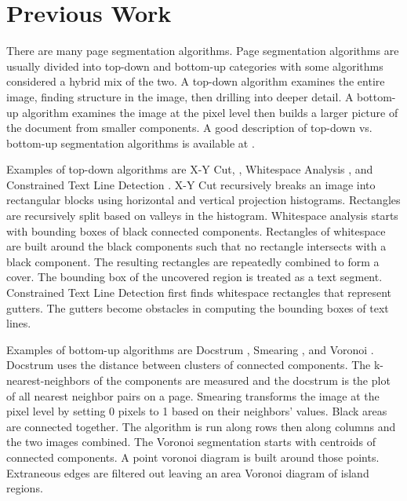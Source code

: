 \documentclass[conference]{IEEEtran}
\begin{document}

\section{Previous Work}


There are many page segmentation algorithms.  Page segmentation algorithms are
usually divided into top-down and bottom-up categories
\cite{shafait2006performance,mao2000empirical} with some algorithms considered
a hybrid mix of the two.
A top-down algorithm examines the entire image, finding
structure in the image, then drilling into deeper detail.  
A bottom-up algorithm examines the image at the pixel level then builds a
larger picture of the document from smaller components.  A good description of
top-down vs. bottom-up segmentation algorithms is
available at \cite{baird1994background}.

Examples of top-down algorithms are 
    X-Y Cut, \cite{nagy1992prototype},
    Whitespace Analysis \cite{baird1994background}, and
    Constrained Text Line Detection \cite{breuel2002two}.
X-Y Cut recursively breaks an image into
rectangular blocks using horizontal and vertical projection histograms.
Rectangles are recursively split based on valleys in the histogram.  Whitespace
analysis starts with bounding boxes of black
connected components. Rectangles of whitespace are built around the black
components such that no rectangle intersects with a black component. The
resulting rectangles are repeatedly combined to form a cover. The bounding box
of the uncovered region is treated as a text segment.  Constrained Text Line
Detection first finds whitespace rectangles that represent gutters.
The gutters become obstacles in computing the bounding boxes of text lines.

Examples of bottom-up algorithms are 
    Docstrum \cite{o1993document},
    Smearing \cite{wong1982document}, and
    Voronoi \cite{kise1998segmentation}.
Docstrum uses the distance between clusters of connected components. The
k-nearest-neighbors of the components are measured and the docstrum is the plot
of all nearest neighbor pairs on a page.  Smearing transforms the image at the pixel level
by setting 0 pixels to 1 based on their neighbors' values. Black areas are
connected together. The algorithm is run along rows then along columns and the
two images combined.
The Voronoi segmentation starts with centroids of connected components. A point voronoi
diagram is built around those points. Extraneous edges are filtered out leaving
an area Voronoi diagram of island regions.
\end{document}
